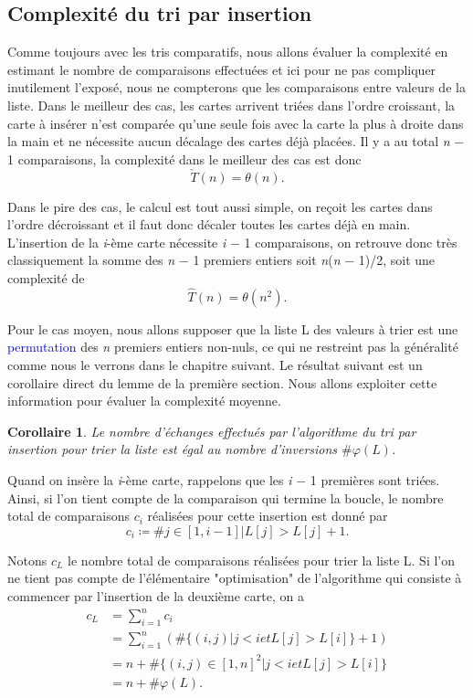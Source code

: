 \documentclass[a4paper,10pt]{article}
\newtheorem{corollaire}[theoreme]{Corollaire}
\begin{document}
\subsection{Complexité du tri par insertion}
Comme toujours avec les tris comparatifs, nous allons évaluer la complexité en estimant le nombre de comparaisons 
effectuées et ici pour ne pas compliquer inutilement l'exposé, nous ne compterons que les comparaisons entre valeurs 
de la liste. Dans le meilleur des cas, les cartes arrivent triées dans l'ordre croissant, la carte à insérer n'est 
comparée qu'une seule fois avec la carte la plus à droite dans la main et ne nécessite aucun décalage des cartes 
déjà placées. Il y a au total {\itshape n} $-$ 1 comparaisons, la complexité dans le meilleur des cas est donc
\[ \check{T}(n) = \theta(n). \]

Dans le pire des cas, le calcul est tout aussi simple, on reçoit les cartes dans l'ordre décroissant et il faut 
donc décaler toutes les cartes déjà en main. L'insertion de la {\itshape i}-ème carte nécessite {\itshape i} $-$ 1
com­pa­rai­sons, on retrouve donc très classiquement la somme des {\itshape n} $-$ 1 premiers entiers soit 
{\itshape n}({\itshape n} $-$ 1)/2, soit une complexité de \[ \hat{T}(n) = \theta(n^2). \]

Pour le cas moyen, nous allons supposer que la liste L des valeurs à trier est une \textcolor{blue}{permutation} 
des {\itshape n} premiers entiers non-nuls, ce qui ne restreint pas la généralité comme nous le verrons dans 
le cha­pi­tre suivant. Le résultat suivant est un corollaire direct du lemme de la première section. 
Nous allons exploiter cette information pour évaluer la complexité moyenne.

\begin{corollaire}
    Le nombre d'échanges effectués par l'algorithme du tri par insertion pour trier la liste 
    est égal au nombre d'inversions $\#\varphi(L)$.
\end{corollaire}

Quand on insère la {\itshape i}-ème carte, rappelons que les {\itshape i} $-$ 1 premières sont triées. 
Ainsi, si l'on tient compte de la comparaison qui termine la boucle, le nombre total de comparaisons $c_i$ réalisées 
pour cette insertion est donné par \[ c_i \coloneqq \#j \in [1, i-1] \lvert L[j] > L[j] + 1. \]

Notons $c_L$ le nombre total de comparaisons réalisées pour trier la liste L. Si l'on ne tient pas compte de 
l'élé­men­tai­re "op­ti­mi­sa­tion" de l'algorithme qui consiste à commencer par l'insertion de la deu­xième carte, on a
\begin{align*}
    c_L & = \sum_{i=1}^{n} c_i \\
        & = \sum_{i=1}^{n}(\#\{(i,j) \lvert j < i et L[j] > L[i]\} + 1) \\
        & = n + \#\{(i,j) \in [1,n]^2 \lvert j < i et L[j] > L[i]\} \\
        & = n + \#\varphi(L). \\
\end{align*}
\end{document}
